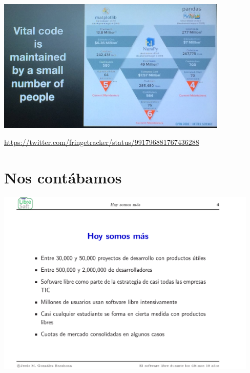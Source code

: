 \documentclass[17pt,aspectratio=169]{beamer}
\begin{document}
\begin{frame}

\begin{center}
  \includegraphics[width=11cm]{figs/few-maintainers}
\end{center}  

\begin{flushright}
  {\scriptsize \url{https://twitter.com/fringetracker/status/991796881767436288}}
\end{flushright}
\end{frame}

\section{Nos contábamos}

\begin{frame}

\begin{center}
  \includegraphics[width=12.5cm]{figs/transpas-05}
\end{center}  

\end{frame}
\end{document}
